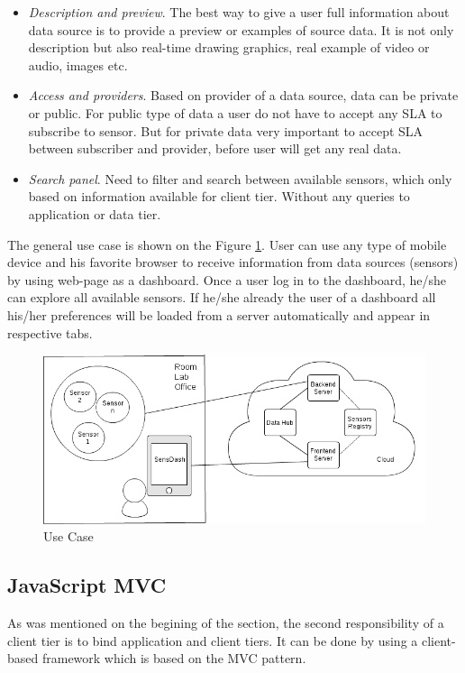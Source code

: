 \begin{itemize}
      \item \emph{Description and preview}. The best way to give a user full information about data source is to provide a preview or examples of source data. It is not only description but also real-time drawing graphics, real example of video or audio, images etc.
      \item \emph{Access and providers}. Based on provider of a data source, data can be private or public. For public type of data a user do not have to accept any SLA to subscribe to sensor. But for private data very important to accept SLA between subscriber and provider, before user will get any real data.
      \item \emph{Search panel}. Need to filter and search between available sensors, which only based on information available for client tier. Without any queries to application or data tier.
      \end{itemize}

    The general use case is shown on the Figure \ref{img:use_case_basic}. User can use any type of mobile device and his favorite browser to receive information from data sources (sensors) by using web-page as a dashboard. Once a user log in to the dashboard, he/she can explore all available sensors. If he/she already the user of a dashboard all his/her preferences will be loaded from a server automatically and appear in respective tabs.

        \begin{figure}[!ht]
        \centering
        \includegraphics[scale=0.6]{images/User_Case.png}   
        \caption[Use Case]{Use Case}
        \label{img:use_case_basic}                        
        \end{figure}

    \subsection{JavaScript MVC}
    As was mentioned on the begining of the section, the second responsibility of a client tier is to bind application and client tiers. It can be done by using a client-based framework which is based on the MVC pattern.

